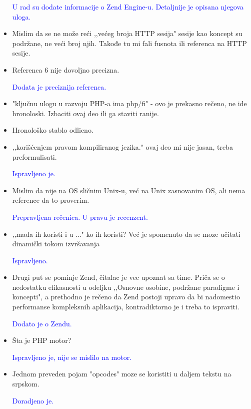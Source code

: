\documentclass[a4paper]{report}
\newcommand{\odgovor}[1]{\textcolor{blue}{#1}}
\begin{document}
\begin{itemize}
\odgovor{U rad su dodate informacije o Zend Engine-u. Detaljnije je opisana njegova uloga.}

\item Mislim da se ne može reći ,,većeg broja HTTP sesija" sesije kao koncept su podržane, ne veći broj njih. Takođe tu mi fali fusnota ili referenca na HTTP sesije.

\odgovor{}

\item Referenca 6 nije dovoljno precizna.

\odgovor{Dodata je preciznija referenca.}

\item "ključnu ulogu u razvoju PHP-a ima php/fi" - ovo je prekasno rečeno, ne ide hronoloski. Izbaciti ovaj deo ili ga staviti ranije.

\odgovor{}

\item Hronološko stablo odlicno.
\item ,,korišćenjem pravom kompiliranog jezika." ovaj deo mi nije jasan, treba preformulisati.

\odgovor{Ispravljeno je.}

\item Mislim da nije na OS sličnim Unix-u, već na Unix zasnovanim OS, ali nema reference da to proverim.

\odgovor{Prepravljena rečenica. U pravu je recenzent.}

\item ,,mada ih koristi i u ..." ko ih koristi? Već je spomenuto da se moze učitati dinamički tokom izvršavanja

\odgovor{Ispravljeno.}

\item Drugi put se pominje Zend, čitalac je vec upoznat sa time. Priča se o nedostatku efikasnosti u odeljku ,,Osnovne osobine, podržane paradigme i koncepti", a prethodno je rečeno da Zend postoji upravo da bi nadomestio performanse kompleksnih aplikacija, kontradiktorno je i treba to ispraviti.

\odgovor{Dodato je o Zendu.}

\item Šta je PHP motor?

\odgovor{Ispravljeno je, nije se mislilo na motor.}

\item Jednom preveden pojam "opcodes" moze se koristiti u daljem tekstu na srpskom.

\odgovor{Doradjeno je.}


\end{itemize}
\end{document}
